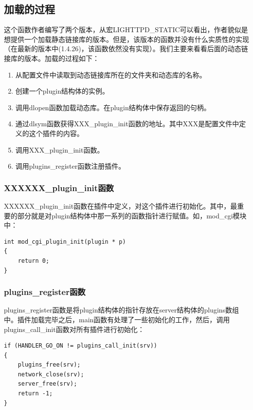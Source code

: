 \documentclass[12pt, dvipdfm]{article}
\begin{document}
\subsection{加载的过程}
这个函数作者编写了两个版本，从宏LIGHTTPD\_STATIC可以看出，作者貌似是想提供一个加载静态链接库的版本。但是，该版本的函数并没有什么实质性的实现（在最新的版本中(1.4.26)，该函数依然没有实现）。我们主要来看看后面的动态链接库的版本。加载的过程如下：
\begin{enumerate}
	\item 从配置文件中读取到动态链接库所在的文件夹和动态库的名称。
	\item 创建一个plugin结构体的实例。
	\item 调用dlopen函数加载动态库。在plugin结构体中保存返回的句柄。
	\item 通过dlsym函数获得XXX\_plugin\_init函数的地址。其中XXX是配置文件中定义的这个插件的内容。
	\item 调用XXX\_plugin\_init函数。
	\item 调用plugins\_register函数注册插件。
\end{enumerate}

\subsubsection{XXXXXX\_plugin\_init函数}
XXXXXX\_plugin\_init函数在插件中定义，对这个插件进行初始化。其中，最重要的部分就是对plugin结构体中那一系列的函数指针进行赋值。如，mod\_cgi模块中：

\begin{verbatim}
int mod_cgi_plugin_init(plugin * p)
{
	return 0;
}
\end{verbatim}


\subsubsection{plugins\_register函数}
plugins\_register函数是将plugin结构体的指针存放在server结构体的plugins数组中。插件加载完毕之后，main函数有处理了一些初始化的工作，然后，调用plugins\_call\_init函数对所有插件进行初始化：

\begin{verbatim}
if (HANDLER_GO_ON != plugins_call_init(srv)) 
{
	plugins_free(srv);
	network_close(srv);
	server_free(srv);
	return -1;
}
\end{verbatim}
\end{document}
